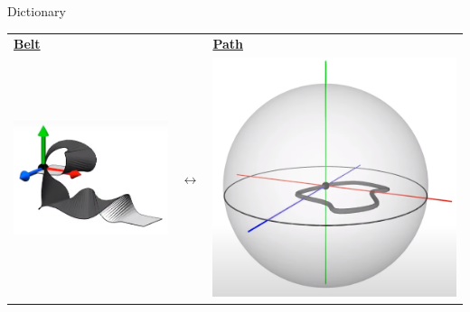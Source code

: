 \documentclass[10pt]{beamer}
\begin{document}
\begin{frame}{Dictionary}
    \begin{center}
    \begin{tabular}{m{3cm} m{2cm} m{3cm}}
        \textbf{\underline{Belt}} & & \textbf{\underline{Path}} \\
        \includegraphics[scale=0.15]{Pictures/randomrotbelt.png} & $\longleftrightarrow$ & \includegraphics[scale=0.1]{Pictures/randomrotsphere.png} \\

\end{tabular}
\end{center}
\end{frame}
\end{document}

